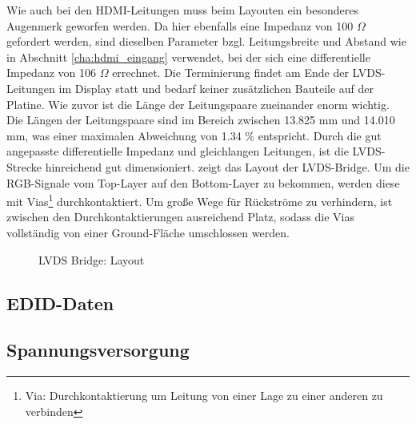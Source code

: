 Wie auch bei den HDMI-Leitungen muss beim Layouten ein besonderes Augenmerk geworfen werden. Da hier ebenfalls eine Impedanz von 100 $\Omega$ gefordert werden, sind dieselben Parameter bzgl. Leitungsbreite und Abstand wie in Abschnitt \ref{cha:hdmi_eingang} verwendet, bei der sich eine differentielle Impedanz von 106 $\Omega$ errechnet.  Die Terminierung findet am Ende der LVDS-Leitungen im Display statt und bedarf keiner zusätzlichen Bauteile auf der Platine. Wie zuvor ist die Länge der Leitungspaare zueinander enorm wichtig. Die Längen der Leitungspaare sind im Bereich zwischen 13.825 mm und 14.010 mm, was einer maximalen Abweichung von 1.34 \% entspricht. Durch die gut angepasste differentielle Impedanz und gleichlangen Leitungen, ist die LVDS-Strecke hinreichend gut dimensioniert.  zeigt das Layout der LVDS-Bridge. Um die RGB-Signale vom Top-Layer auf den Bottom-Layer zu bekommen, werden diese mit Vias\footnote{Via: Durchkontaktierung um Leitung von einer Lage zu einer anderen zu verbinden} durchkontaktiert. Um große Wege für Rückströme zu verhindern, ist zwischen den Durchkontaktierungen ausreichend Platz, sodass die Vias vollständig von einer Ground-Fläche umschlossen werden.
\begin{figure}[htp]
		\center
        \caption{LVDS Bridge: Layout}
       \label{fig:teilb_lvds_bridge_pcb}
\end{figure}
\newpage


\subsection{EDID-Daten}
\subsection{Spannungsversorgung}
